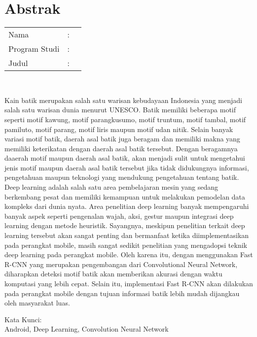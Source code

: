 %
%
%

\chapter*{Abstrak}

\vspace*{0.2cm}

\noindent \begin{tabular}{l l p{10cm}}
	Nama&: & \penulis \\
	Program Studi&: & \program \\
	Judul&: & \judul \\
\end{tabular} \\ 

\vspace*{0.5cm}

\noindent Kain batik merupakan salah satu warisan kebudayaan Indonesia yang menjadi salah satu warisan dunia menurut UNESCO. Batik memiliki beberapa motif seperti motif kawung, motif parangkusumo, motif truntum, motif tambal, motif pamiluto, motif parang, motif liris maupun motif udan nitik. Selain banyak variasi motif batik, daerah asal batik juga beragam dan memiliki makna yang memiliki keterikatan dengan daerah asal batik tersebut. Dengan beragamnya daaerah motif maupun daerah asal batik, akan menjadi sulit untuk mengetahui jenis motif maupun daerah asal batik tersebut jika tidak didukungnya informasi, pengetahuan maupun teknologi yang mendukung pengetahuan tentang batik. Deep learning adalah salah satu area pembelajaran mesin yang sedang berkembang pesat dan memiliki kemampuan untuk melakukan pemodelan data kompleks dari dunia nyata. Area penelitian deep learning banyak mempengaruhi banyak aspek seperti pengenalan wajah, aksi, gestur maupun integrasi deep learning dengan metode heuristik. Sayangnya, meskipun penelitian terkait deep learning tersebut akan sangat penting dan bermanfaat ketika diimplementasikan pada perangkat mobile, masih sangat sedikit penelitian yang mengadopsi teknik deep learning pada perangkat mobile. Oleh karena itu, dengan menggunakan Fast R-CNN yang merupakan pengembangan dari Convolutional Neural Network, diharapkan deteksi motif batik akan memberikan akurasi dengan waktu komputasi yang lebih cepat. Selain itu, implementasi Fast R-CNN akan dilakukan pada perangkat mobile dengan tujuan informasi batik lebih mudah dijangkau oleh masyarakat luas.  \\

\vspace*{0.2cm}

\noindent Kata Kunci: \\ 
\noindent Android, Deep Learning, Convolution Neural Network \\

\newpage